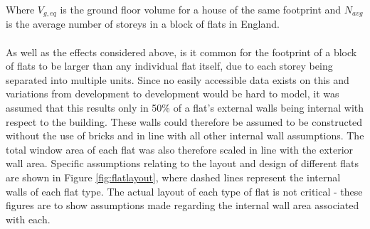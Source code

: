 \documentclass[12pt]{article}
\begin{document}
\noindent
Where $V_{g,eq}$ is the ground floor volume for a house of the same footprint and $N_{avg}$ is the average number of storeys in a block of flats in England. 

\paragraph{}
As well as the effects considered above, is it common for the footprint of a block of flats to be larger than any individual flat itself, due to each storey being separated into multiple units. Since no easily accessible data exists on this and variations from development to development would be hard to model, it was assumed that this results only in 50\% of a flat’s external walls being internal with respect to the building. These walls could therefore be assumed to be constructed without the use of bricks and in line with all other internal wall assumptions. The total window area of each flat was also therefore scaled in line with the exterior wall area. Specific assumptions relating to the layout and design of different flats are shown in Figure \ref{fig:flatlayout}, where dashed lines represent the internal walls of each flat type. The actual layout of each type of flat is not critical - these figures are to show assumptions made regarding the internal wall area associated with each.
\end{document}
